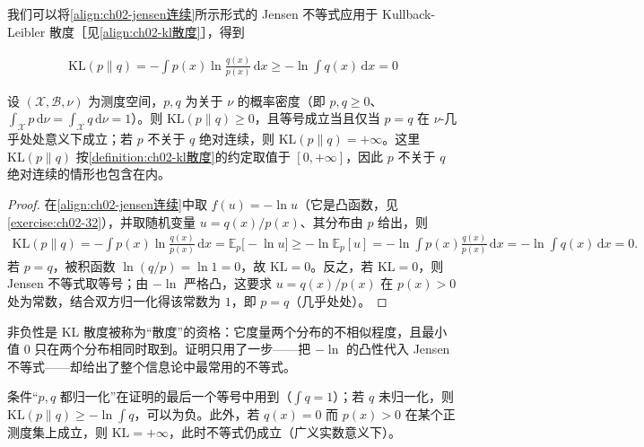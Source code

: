 \documentclass[../../main.tex]{subfiles}
\begin{document}
我们可以将\eqref{align:ch02-jensen连续}所示形式的 Jensen 不等式应用于 Kullback-Leibler 散度［见\eqref{align:ch02-kl散度}］，得到

\begin{align}
  \mathrm{KL}(p\|q) = -\int p(x)\ln\frac{q(x)}{p(x)}\,\mathrm{d}x \geqslant -\ln\int q(x)\,\mathrm{d}x = 0
  \label{align:ch02-kl非负}
\end{align}

\begin{proposition}[KL 散度的非负性]\label{proposition:ch02-kl非负}
设 $(\mathcal{X},\mathcal{B},\nu)$ 为测度空间，$p,q$ 为关于 $\nu$ 的概率密度（即 $p,q\geqslant0$、$\int_{\mathcal{X}}p\,\mathrm{d}\nu=\int_{\mathcal{X}}q\,\mathrm{d}\nu=1$）。则 $\mathrm{KL}(p\|q)\geqslant0$，且等号成立当且仅当 $p=q$ 在 $\nu$-几乎处处意义下成立；若 $p$ 不关于 $q$ 绝对连续，则 $\mathrm{KL}(p\|q)=+\infty$。这里 $\mathrm{KL}(p\|q)$ 按\cref{definition:ch02-kl散度}的约定取值于 $[0,+\infty]$，因此 $p$ 不关于 $q$ 绝对连续的情形也包含在内。
\end{proposition}

\begin{proof}
在\eqref{align:ch02-jensen连续}中取 $f(u)=-\ln u$（它是凸函数，见\cref{exercise:ch02-32}），并取随机变量 $u=q(x)/p(x)$、其分布由 $p$ 给出，则
\begin{align*}
  \mathrm{KL}(p\|q) = -\int p(x)\ln\frac{q(x)}{p(x)}\,\mathrm{d}x
  = \mathbb{E}_p\big[-\ln u\big]
  \geqslant -\ln\mathbb{E}_p[u]
  = -\ln\int p(x)\frac{q(x)}{p(x)}\,\mathrm{d}x = -\ln\int q(x)\,\mathrm{d}x = 0 .
\end{align*}
若 $p=q$，被积函数 $\ln(q/p)=\ln1=0$，故 $\mathrm{KL}=0$。反之，若 $\mathrm{KL}=0$，则 Jensen 不等式取等号；由 $-\ln$ 严格凸，这要求 $u=q(x)/p(x)$ 在 $p(x)>0$ 处为常数，结合双方归一化得该常数为 $1$，即 $p=q$（几乎处处）。
\end{proof}

\begin{remark}
非负性是 KL 散度被称为“散度”的资格：它度量两个分布的不相似程度，且最小值 $0$ 只在两个分布相同时取到。证明只用了一步——把 $-\ln$ 的凸性代入 Jensen 不等式——却给出了整个信息论中最常用的不等式。

条件“$p,q$ 都归一化”在证明的最后一个等号中用到（$\int q=1$）；若 $q$ 未归一化，则 $\mathrm{KL}(p\|q)\geqslant-\ln\int q$，可以为负。此外，若 $q(x)=0$ 而 $p(x)>0$ 在某个正测度集上成立，则 $\mathrm{KL}=+\infty$，此时不等式仍成立（广义实数意义下）。
\end{remark}
\end{document}
